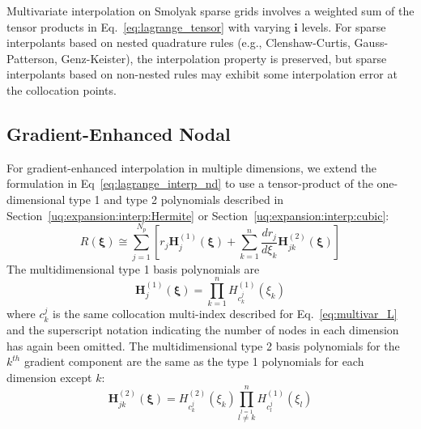 Multivariate interpolation on Smolyak sparse grids involves a weighted
sum of the tensor products in Eq.~\ref{eq:lagrange_tensor} with
varying $\boldsymbol{i}$ levels.  For sparse interpolants based on
nested quadrature rules (e.g., Clenshaw-Curtis, Gauss-Patterson,
Genz-Keister), the interpolation property is preserved, but sparse
interpolants based on non-nested rules may exhibit some interpolation
error at the collocation points.


\subsection{Gradient-Enhanced Nodal} \label{uq:expansion:sc:gradient}

For gradient-enhanced interpolation in multiple dimensions, we extend
the formulation in Eq~\ref{eq:lagrange_interp_nd} to use a
tensor-product of the one-dimensional type 1 and type 2 polynomials
described in Section~\ref{uq:expansion:interp:Hermite} or
Section~\ref{uq:expansion:interp:cubic}:
\begin{equation}
R(\boldsymbol{\xi}) \cong \sum_{j=1}^{N_p} \left[ 
r_j \boldsymbol{H}_j^{(1)}(\boldsymbol{\xi}) + 
\sum_{k=1}^n \frac{dr_j}{d\xi_k} \boldsymbol{H}_{jk}^{(2)}(\boldsymbol{\xi}) 
\right] \label{eq:hermite_interp_nd}
\end{equation}
The multidimensional type 1 basis polynomials are
\begin{equation}
\boldsymbol{H}_j^{(1)}(\boldsymbol{\xi}) =
\prod_{k=1}^{n} H^{(1)}_{c^j_k}(\xi_k) \label{eq:multivar_H1}
\end{equation}
where $c_k^j$ is the same collocation multi-index described for
Eq.~\ref{eq:multivar_L} and the superscript notation indicating the
number of nodes in each dimension has again been omitted.  The
multidimensional type 2 basis polynomials for the $k^{th}$ gradient
component are the same as the type 1 polynomials for each dimension
except $k$:
\begin{equation}
\boldsymbol{H}_{jk}^{(2)}(\boldsymbol{\xi}) = H^{(2)}_{c^j_k}(\xi_k)
\prod_{\stackrel{\scriptstyle l=1}{l \ne k}}^{n} H^{(1)}_{c^j_l}(\xi_l) 
\label{eq:multivar_H2}
\end{equation}

